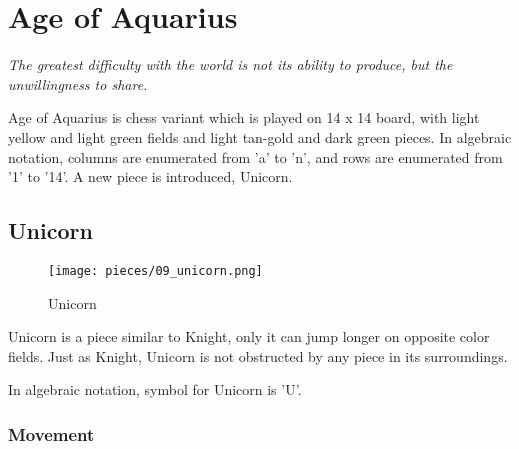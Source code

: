 

\chapter*{Age of Aquarius}
\label{ch:Age of Aquarius}

\begin{flushright}
\parbox{0.8\textwidth}{
\emph{The greatest difficulty with the world is not its ability to produce, but the unwillingness to share. \\
 } }
\end{flushright}

\noindent
Age of Aquarius is chess variant which is played on 14 x 14 board,
with light yellow and light green fields and light tan-gold and
dark green pieces. In algebraic notation, columns are enumerated
from 'a' to 'n', and rows are enumerated from '1' to '14'. A new
piece is introduced, Unicorn.

\clearpage %

\section*{Unicorn}
\label{sec:Age of Aquarius/Unicorn}

\noindent
\begin{wrapfigure}[7]{l}{0.4\textwidth}
\centering
\texttt{[image: pieces/09\_unicorn.png]}
\caption{Unicorn}
\label{fig:09_unicorn}
\end{wrapfigure}
Unicorn is a piece similar to Knight, only it can jump longer on
opposite color fields. Just as Knight, Unicorn is not obstructed
by any piece in its surroundings.

In algebraic notation, symbol for Unicorn is 'U'.

\vspace{4\baselineskip}
\subsection*{Movement}
\label{sec:Age of Aquarius/Unicorn/Movement}

